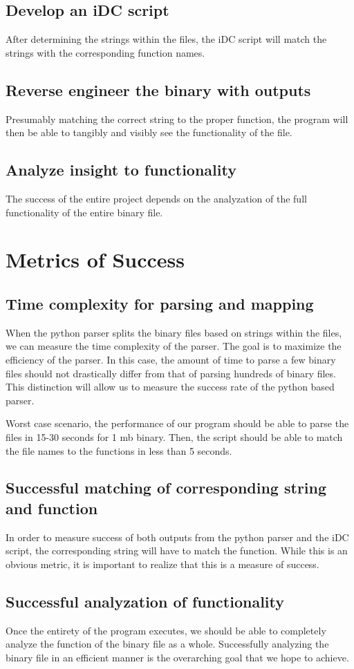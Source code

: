 \documentclass[journal,12pt,onecolumn,draftclsnofoot,]{IEEEtran}
\begin{document}
\subsection{Develop an iDC script}
After determining the strings within the files, the iDC script will match the strings with the corresponding function names.

\subsection{Reverse engineer the binary with outputs}
Presumably matching the correct string to the proper function, the program will then be able to tangibly and visibly see the functionality of the file.

\subsection{Analyze insight to functionality}
The success of the entire project depends on the analyzation of the full functionality of the entire binary file.

\section{Metrics of Success}

\subsection{Time complexity for parsing and mapping}
When the python parser splits the binary files based on strings within the files, we can measure the time complexity of the parser. The goal is to maximize the efficiency of the parser. In this case, the amount of time to parse a few binary files should not drastically differ from that of parsing hundreds of binary files. This distinction will allow us to measure the success rate of the python based parser.

Worst case scenario, the performance of our program should be able to parse the files in 15-30 seconds for 1 mb binary. Then, the script should be able to match the file names to the functions in less than 5 seconds.

\subsection{Successful matching of corresponding string and function}
In order to measure success of both outputs from the python parser and the iDC script, the corresponding string will have to match the function. While this is an obvious metric, it is important to realize that this is a measure of success. 

\subsection{Successful analyzation of functionality}
Once the entirety of the program executes, we should be able to completely analyze the function of the binary file as a whole. Successfully analyzing the binary file in an efficient manner is the overarching goal that we hope to achieve. 

\vspace{12pt}
\end{document}
